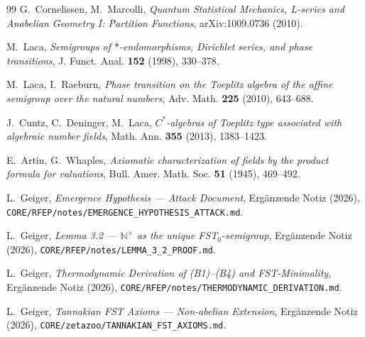 \documentclass[11pt,a4paper]{article}
\theoremstyle{plain}
\theoremstyle{definition}
\newcommand{\N}{\mathbb{N}}
\begin{document}
\begin{thebibliography}{99}
G.~Cornelissen, M.~Marcolli,
\textit{Quantum Statistical Mechanics, L-series and Anabelian
Geometry I: Partition Functions},
arXiv:1009.0736 (2010).

M.~Laca,
\textit{Semigroups of $\ast$-endomorphisms, Dirichlet series, and
phase transitions},
J. Funct. Anal. \textbf{152} (1998), 330--378.

M.~Laca, I.~Raeburn,
\textit{Phase transition on the Toeplitz algebra of the affine
semigroup over the natural numbers},
Adv. Math. \textbf{225} (2010), 643--688.

J.~Cuntz, C.~Deninger, M.~Laca,
\textit{$C^\ast$-algebras of Toeplitz type associated with
algebraic number fields},
Math. Ann. \textbf{355} (2013), 1383--1423.

E.~Artin, G.~Whaples,
\textit{Axiomatic characterization of fields by the product formula
for valuations},
Bull. Amer. Math. Soc. \textbf{51} (1945), 469--492.

L.~Geiger,
\textit{Emergence Hypothesis --- Attack Document},
Ergänzende Notiz (2026),
\texttt{CORE/RFEP/notes/EMERGENCE\_HYPOTHESIS\_ATTACK.md}.

L.~Geiger,
\textit{Lemma 3.2 --- $\N^\times$ as the unique FST$_0$-semigroup},
Ergänzende Notiz (2026),
\texttt{CORE/RFEP/notes/LEMMA\_3\_2\_PROOF.md}.

L.~Geiger,
\textit{Thermodynamic Derivation of (B1)--(B4) and FST-Minimality},
Ergänzende Notiz (2026),
\texttt{CORE/RFEP/notes/THERMODYNAMIC\_DERIVATION.md}.

L.~Geiger,
\textit{Tannakian FST Axioms --- Non-abelian Extension},
Ergänzende Notiz (2026),
\texttt{CORE/zetazoo/TANNAKIAN\_FST\_AXIOMS.md}.

\end{thebibliography}
\end{document}
